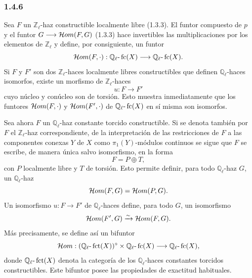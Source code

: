\subsubsection*{1.4.6}
Sea \(F\) un \(\mathbb Z_\ell\)-haz constructible localmente libre (1.3.3). El funtor compuesto de \(p\) y el funtor \(G\longrightarrow\mathcal{H}om(F,G)\) (1.3.3) hace invertibles las multiplicaciones por los elementos de \(\mathbb Z_\ell\) y define, por consiguiente, un funtor
\[
\mathcal{H}om(F,\cdot):\mathbb Q_\ell\text{-}\operatorname{fc}(X)\longrightarrow \mathbb Q_\ell\text{-}\operatorname{fc}(X).
\]
Si \(F\) y \(F'\) son dos \(\mathbb Z_\ell\)-haces localmente libres constructibles que definen \(\mathbb Q_\ell\)-haces isomorfos, existe un morfismo de \(\mathbb Z_\ell\)-haces
\[
u:F\longrightarrow F'
\]
cuyo núcleo y conúcleo son de torsión. Esto muestra inmediatamente que los funtores \(\mathcal{H}om(F,\cdot)\) y \(\mathcal{H}om(F',\cdot)\) de \(\mathbb Q_\ell\text{-}\operatorname{fc}(X)\) en sí misma son isomorfos.

Sea ahora \(F\) un \(\mathbb Q_\ell\)-haz constante torcido constructible. Si se denota también por \(F\) el \(\mathbb Z_\ell\)-haz correspondiente, de la interpretación de las restricciones de \(F\) a las componentes conexas \(Y\) de \(X\) como \(\pi_1(Y)\)-módulos continuos se sigue que \(F\) se escribe, de manera única salvo isomorfismo, en la forma
\[
F=P\oplus T,
\]
con \(P\) localmente libre y \(T\) de torsión. Esto permite definir, para todo \(\mathbb Q_\ell\)-haz \(G\), un \(\mathbb Q_\ell\)-haz
\[
\mathcal{H}om(F,G)=\mathcal{H}om(P,G).
\]
Un isomorfismo \(u:F\to F'\) de \(\mathbb Q_\ell\)-haces define, para todo \(G\), un isomorfismo
\[
\mathcal{H}om(F',G)\xrightarrow{\sim}\mathcal{H}om(F,G).
\]
Más precisamente, se define así un bifuntor
\[
\mathcal{H}om:(\mathbb Q_\ell\text{-}\operatorname{fct}(X))^\circ\times \mathbb Q_\ell\text{-}\operatorname{fc}(X)
\longrightarrow \mathbb Q_\ell\text{-}\operatorname{fc}(X),
\]
donde \(\mathbb Q_\ell\text{-}\operatorname{fct}(X)\) denota la categoría de los \(\mathbb Q_\ell\)-haces constantes torcidos constructibles. Este bifuntor posee las propiedades de exactitud habituales.
